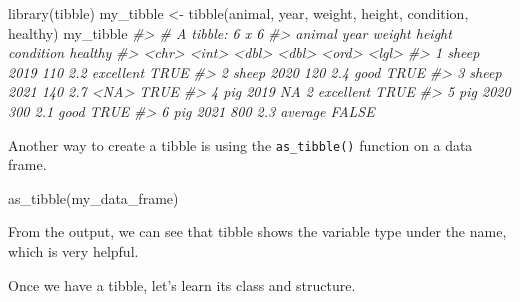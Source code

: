 \documentclass[
]{book}
\newenvironment{Shaded}{\begin{snugshade}}{\end{snugshade}}
\newcommand{\CommentTok}[1]{\textcolor[rgb]{0.56,0.35,0.01}{\textit{#1}}}
\newcommand{\FunctionTok}[1]{\textcolor[rgb]{0.00,0.00,0.00}{#1}}
\newcommand{\NormalTok}[1]{#1}
\newcommand{\OtherTok}[1]{\textcolor[rgb]{0.56,0.35,0.01}{#1}}
\begin{document}
\begin{Shaded}
\begin{Highlighting}[]
\FunctionTok{library}\NormalTok{(tibble)}
\NormalTok{my\_tibble }\OtherTok{\textless{}{-}} \FunctionTok{tibble}\NormalTok{(animal, year, weight, height, condition, healthy)}
\NormalTok{my\_tibble}
\CommentTok{\#\textgreater{} \# A tibble: 6 x 6}
\CommentTok{\#\textgreater{}   animal  year weight height condition healthy}
\CommentTok{\#\textgreater{}   \textless{}chr\textgreater{}  \textless{}int\textgreater{}  \textless{}dbl\textgreater{}  \textless{}dbl\textgreater{} \textless{}ord\textgreater{}     \textless{}lgl\textgreater{}  }
\CommentTok{\#\textgreater{} 1 sheep   2019    110    2.2 excellent TRUE   }
\CommentTok{\#\textgreater{} 2 sheep   2020    120    2.4 good      TRUE   }
\CommentTok{\#\textgreater{} 3 sheep   2021    140    2.7 \textless{}NA\textgreater{}      TRUE   }
\CommentTok{\#\textgreater{} 4 pig     2019     NA    2   excellent TRUE   }
\CommentTok{\#\textgreater{} 5 pig     2020    300    2.1 good      TRUE   }
\CommentTok{\#\textgreater{} 6 pig     2021    800    2.3 average   FALSE}
\end{Highlighting}
\end{Shaded}

Another way to create a tibble is using the \texttt{as\_tibble()} function on a data frame.

\begin{Shaded}
\begin{Highlighting}[]
\FunctionTok{as\_tibble}\NormalTok{(my\_data\_frame)}
\end{Highlighting}
\end{Shaded}

From the output, we can see that tibble shows the variable type under the name, which is very helpful.

Once we have a tibble, let's learn its class and structure.

\begin{Shaded}
\end{Shaded}
\end{document}
